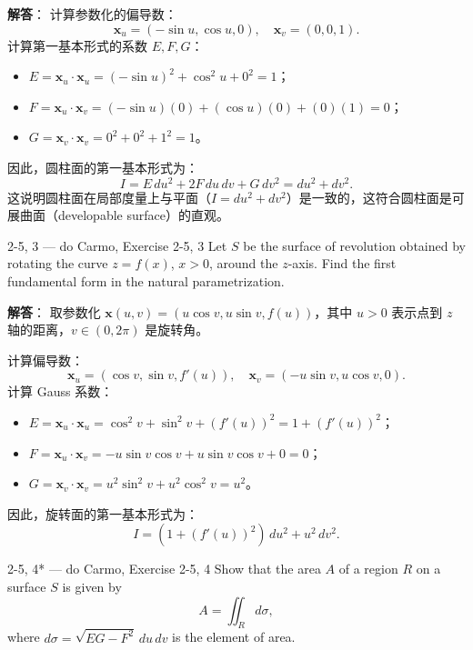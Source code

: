 \begin{solution}
\textbf{解答}：
计算参数化的偏导数：
\[
\mathbf{x}_u = (-\sin u, \cos u, 0), \quad \mathbf{x}_v = (0, 0, 1).
\]
计算第一基本形式的系数 $E, F, G$：
\begin{itemize}
    \item $E = \mathbf{x}_u \cdot \mathbf{x}_u = (-\sin u)^2 + \cos^2 u + 0^2 = 1$；
    \item $F = \mathbf{x}_u \cdot \mathbf{x}_v = (-\sin u)(0) + (\cos u)(0) + (0)(1) = 0$；
    \item $G = \mathbf{x}_v \cdot \mathbf{x}_v = 0^2 + 0^2 + 1^2 = 1$。
\end{itemize}
因此，圆柱面的第一基本形式为：
\[
I = E\, du^2 + 2F\, du\, dv + G\, dv^2 = du^2 + dv^2.
\]
这说明圆柱面在局部度量上与平面（$I = du^2 + dv^2$）是一致的，这符合圆柱面是可展曲面（developable surface）的直观。
\end{solution}

\begin{exercise}{2-5, 3 — do Carmo, Exercise 2-5, 3}
Let $S$ be the surface of revolution obtained by rotating the curve $z = f(x)$, $x > 0$, around the $z$-axis. Find the first fundamental form in the natural parametrization.
\end{exercise}

\begin{solution}
\textbf{解答}：
取参数化 $\mathbf{x}(u, v) = (u \cos v, u \sin v, f(u))$，其中 $u > 0$ 表示点到 $z$ 轴的距离，$v \in (0, 2\pi)$ 是旋转角。

计算偏导数：
\[
\mathbf{x}_u = (\cos v, \sin v, f'(u)), \quad \mathbf{x}_v = (-u \sin v, u \cos v, 0).
\]
计算 Gauss 系数：
\begin{itemize}
    \item $E = \mathbf{x}_u \cdot \mathbf{x}_u = \cos^2 v + \sin^2 v + (f'(u))^2 = 1 + (f'(u))^2$；
    \item $F = \mathbf{x}_u \cdot \mathbf{x}_v = -u \sin v \cos v + u \sin v \cos v + 0 = 0$；
    \item $G = \mathbf{x}_v \cdot \mathbf{x}_v = u^2 \sin^2 v + u^2 \cos^2 v = u^2$。
\end{itemize}
因此，旋转面的第一基本形式为：
\[
I = (1 + (f'(u))^2)\, du^2 + u^2\, dv^2.
\]
\end{solution}

\begin{exercise}{2-5, 4* — do Carmo, Exercise 2-5, 4}
Show that the area $A$ of a region $R$ on a surface $S$ is given by
\[
A = \iint_R d\sigma,
\]
where $d\sigma = \sqrt{EG - F^2}\, du\, dv$ is the element of area.
\end{exercise}

